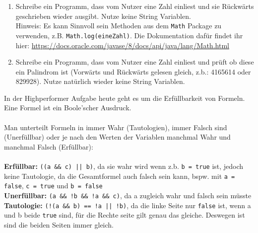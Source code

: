 \documentclass{../../sheet}
\begin{document}
\begin{enumerate}
    \item Schreibe ein Programm, dass vom Nutzer eine Zahl einliest und sie Rückwärts geschrieben wieder ausgibt. Nutze keine String Variablen.\\
    Hinweis: Es kann Sinnvoll sein Methoden aus dem \texttt{Math} Package zu verwenden, z.B. \texttt{Math.log(eineZahl)}. Die Dokumentation dafür findet ihr hier: \url{https://docs.oracle.com/javase/8/docs/api/java/lang/Math.html}
    \item Schreibe ein Programm, dass vom Nutzer eine Zahl einliest und prüft ob diese ein Palindrom ist (Vorwärts und Rückwärts gelesen gleich, z.b.: 4165614 oder 829928). Nutze natürlich wieder keine String Variablen.
\end{enumerate}

\newpage
{}
In der Highperformer Aufgabe heute geht es um die Erfüllbarkeit von Formeln. Eine Formel ist ein Boole'scher Ausdruck. 
\\\\
Man unterteilt Formeln in immer Wahr (Tautologien), immer Falsch sind (Unerfüllbar) oder je nach den Werten der Variablen manchmal Wahr und manchmal Falsch (Erfüllbar):
\\\\
\textbf{Erfüllbar: } \texttt{((a \&\& c) || b)}, da sie wahr wird wenn z.b. \texttt{b = true} ist, jedoch keine Tautologie, da die Gesamtformel auch falsch sein kann, bspw. mit \texttt{a = false}, \texttt{c = true} und \texttt{b = false}\\
\textbf{Unerfüllbar: } \texttt{(a \&\& !b \&\& !a \&\& c)}, da a zugleich wahr und falsch sein müsste\\
\textbf{Tautologie: } \texttt{(!(a \&\& b) == !a || !b)}, da die linke Seite nur \texttt{false} ist, wenn a und b beide \texttt{true} sind, für die Rechte seite gilt genau das gleiche. Deswegen ist sind die beiden Seiten immer gleich.
\end{document}
